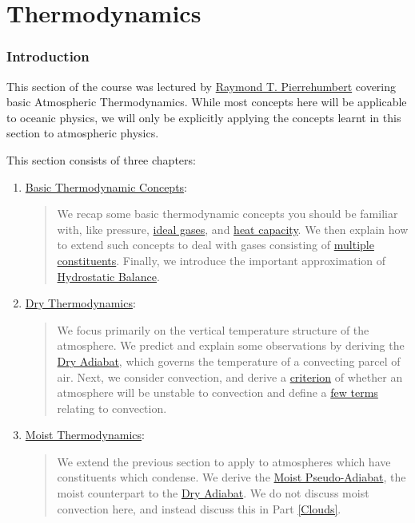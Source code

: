 \part{Thermodynamics}\label{Thermodynamics}

\section*{Introduction}

This section of the course was lectured by \href{https://users.physics.ox.ac.uk/~pierrehumbert/}{Raymond T. Pierrehumbert} covering basic Atmospheric Thermodynamics. While most concepts here will be applicable to oceanic physics, we will only be explicitly applying the concepts learnt in this section to atmospheric physics.\vspace{5 mm}

\noindent This section consists of three chapters:\vspace{5 mm}

\begin{enumerate}
    \item \hyperref[Basic Thermodynamics]{Basic Thermodynamic Concepts}: 
        
        \begin{quote}
            We recap some basic thermodynamic concepts you should be familiar with, like pressure, \hyperref[Ideal Gas Box]{ideal gases}, and \hyperref[Equipartition]{heat capacity}. We then explain how to extend such concepts to deal with gases consisting of \hyperref[Definition Multiple]{multiple constituents}. Finally, we introduce the important approximation of \hyperref[Hydrostatic Box]{Hydrostatic Balance}.
        \end{quote}

    \item \hyperref[Dry Thermodynamics]{Dry Thermodynamics}: 
    
        \begin{quote}
            We focus primarily on the vertical temperature structure of the atmosphere. We predict and explain some observations by deriving the \hyperref[Dry Adiabat Box]{Dry Adiabat}, which governs the temperature of a convecting parcel of air. Next, we consider convection, and derive a \hyperref[Dry Stability Box]{criterion} of whether an atmosphere will be unstable to convection and define a \hyperref[Convection Box]{few terms} relating to convection.
        \end{quote}
    
    \item \hyperref[Moist Thermodynamics]{Moist Thermodynamics}:
        \begin{quote}
            We extend the previous section to apply to atmospheres which have constituents which condense. We derive the \hyperref[Moist Pseudo Adiabat]{Moist Pseudo-Adiabat}, the moist counterpart to the \hyperref[Dry Adiabat Box]{Dry Adiabat}. We do not discuss moist convection here, and instead discuss this in Part \ref{Clouds}.
        \end{quote}
\end{enumerate}

